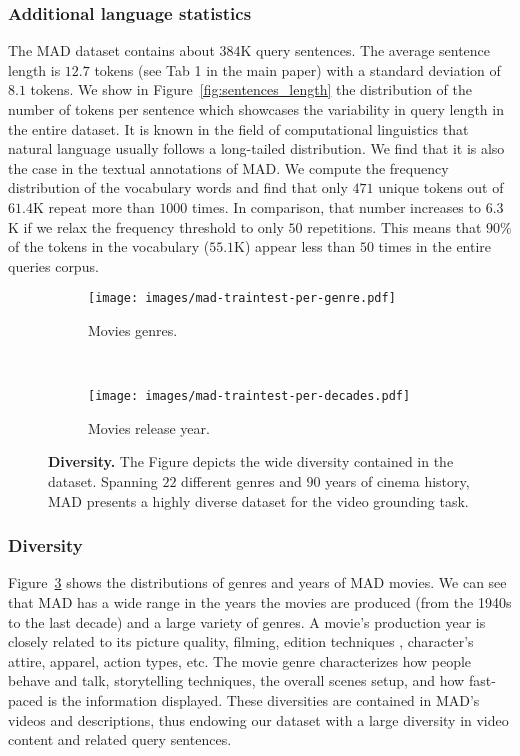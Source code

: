 \documentclass[10pt,twocolumn,letterpaper]{article}
\begin{document}
\subsubsection{Additional language statistics}
The MAD dataset contains about $384$K query sentences. The average sentence length is $12.7$ tokens (see Tab 1 in the main paper) with a standard deviation of $8.1$ tokens. 
We show in Figure~\ref{fig:sentences_length} the distribution of the number of tokens per sentence which showcases the variability in query length in the entire dataset.
It is known in the field of computational linguistics that natural language usually follows a long-tailed distribution. We find that it is also the case in the textual annotations of MAD. We compute the frequency distribution of the vocabulary words and find that only $471$ unique tokens out of $61.4$K repeat more than $1000$ times. In comparison, that number increases to $6.3$K if we relax the frequency threshold to only $50$ repetitions. This means that $90\%$ of the tokens in the vocabulary ($55.1$K) appear less than $50$ times in the entire queries corpus. 

\begin{figure}[t]
    \vspace{-0.5cm}
    \centering
    \begin{subfigure}[t]{0.8\linewidth}
        \centering
        \texttt{[image: images/mad-traintest-per-genre.pdf]}
        \caption{Movies genres.}
        \label{fig:genres}
    \end{subfigure}\\
    \begin{subfigure}[t]{0.8\linewidth}
        \centering
        \texttt{[image: images/mad-traintest-per-decades.pdf]}
        \caption{Movies release year.}
        \label{fig:years}
    \end{subfigure}\caption{\textbf{Diversity.} The Figure depicts the wide diversity contained in the dataset. Spanning $22$ different genres and $90$ years of cinema history, MAD presents a highly diverse dataset for the video grounding task. }
    \label{fig:dataset-statistics-supp}
    \vspace{-0.5cm}
\end{figure} 
\subsubsection{Diversity}
Figure~\ref{fig:dataset-statistics-supp} shows the distributions of genres and years of MAD movies. We can see that MAD has a wide range in the years the movies are produced (from the 1940s to the last decade) and a large variety of genres. A movie's production year is closely related to its picture quality, filming, edition techniques \cite{pardo2021moviecuts}, character's attire, apparel, action types, etc. The movie genre characterizes how people behave and talk, storytelling techniques, the overall scenes setup, and how fast-paced is the information displayed. These diversities are contained in MAD's videos and descriptions, thus endowing our dataset with a large diversity in video content and related query sentences. 
     
\end{document}
